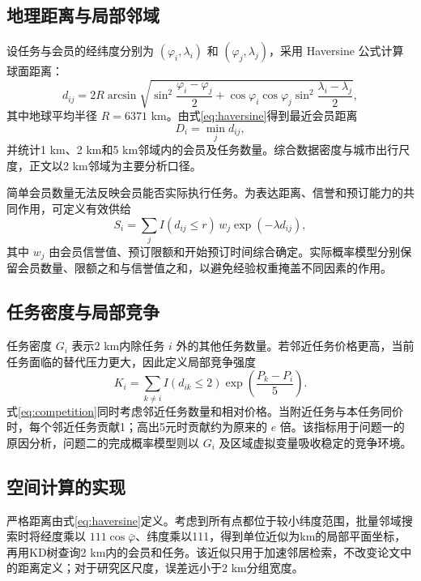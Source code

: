 ﻿\documentclass[UTF8,zihao=-4,a4paper,fontset=fandol]{ctexart}
\begin{document}
\subsection{地理距离与局部邻域}

设任务与会员的经纬度分别为 $(\varphi_i,\lambda_i)$ 和 $(\varphi_j,\lambda_j)$，采用 Haversine 公式计算球面距离：
\begin{equation}
d_{ij}=2R\arcsin\sqrt{
\sin^2\frac{\varphi_i-\varphi_j}{2}
+\cos\varphi_i\cos\varphi_j
\sin^2\frac{\lambda_i-\lambda_j}{2}},
\label{eq:haversine}
\end{equation}
其中地球平均半径 $R=6371$ km。由式\eqref{eq:haversine}得到最近会员距离
\begin{equation}
D_i=\min_j d_{ij},
\label{eq:nearest}
\end{equation}
并统计1 km、2 km和5 km邻域内的会员及任务数量。综合数据密度与城市出行尺度，正文以2 km邻域为主要分析口径。

简单会员数量无法反映会员能否实际执行任务。为表达距离、信誉和预订能力的共同作用，可定义有效供给
\begin{equation}
S_i=\sum_j I(d_{ij}\le r)\,w_j\exp(-\lambda d_{ij}),
\label{eq:supply}
\end{equation}
其中 $w_j$ 由会员信誉值、预订限额和开始预订时间综合确定。实际概率模型分别保留会员数量、限额之和与信誉值之和，以避免经验权重掩盖不同因素的作用。

\subsection{任务密度与局部竞争}

任务密度 $G_i$ 表示2 km内除任务 $i$ 外的其他任务数量。若邻近任务价格更高，当前任务面临的替代压力更大，因此定义局部竞争强度
\begin{equation}
K_i=\sum_{k\ne i}I(d_{ik}\le2)
\exp\left(\frac{P_k-P_i}{5}\right).
\label{eq:competition}
\end{equation}
式\eqref{eq:competition}同时考虑邻近任务数量和相对价格。当附近任务与本任务同价时，每个邻近任务贡献1；高出5元时贡献约为原来的 $e$ 倍。该指标用于问题一的原因分析，问题二的完成概率模型则以 $G_i$ 及区域虚拟变量吸收稳定的竞争环境。

\subsection{空间计算的实现}

严格距离由式\eqref{eq:haversine}定义。考虑到所有点都位于较小纬度范围，批量邻域搜索时将经度乘以 $111\cos\bar\varphi$、纬度乘以111，得到单位近似为km的局部平面坐标，再用KD树查询2 km内的会员和任务。该近似只用于加速邻居检索，不改变论文中的距离定义；对于研究区尺度，误差远小于2 km分组宽度。
\end{document}
